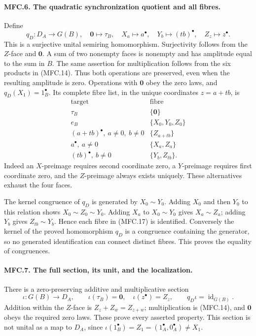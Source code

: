 \paragraph{MFC.6. The quadratic synchronization quotient and all fibres.}
Define
\[
 q_D:D_A\longrightarrow G(B),\quad
 \mathbf0\longmapsto\tau_B,\quad X_a\longmapsto a^\bullet,\quad
 Y_b\longmapsto(tb)^\bullet,\quad Z_z\longmapsto z^\bullet.
                                                               \tag{MFC.16}
\]
This is a surjective unital semiring homomorphism. Surjectivity follows
from the \(Z\)-face and \(\mathbf0\). A sum of two nonempty faces is
nonempty and has amplitude equal to the sum in \(B\). The same assertion
for multiplication follows from the six products in (MFC.14).
Thus both operations are preserved, even when the resulting amplitude
is zero. Operations with \(\mathbf0\) obey the zero laws, and
\(q_D(X_1)=1_B^\bullet\).
Its complete fibre list, in the unique coordinates \(z=a+tb\), is
\[
 \begin{array}{c|c}
 \text{target}&\text{fibre}\\ \hline
 \tau_B&\{\mathbf0\}\\
 e_B&\{X_0,Y_0,Z_0\}\\
 (a+tb)^\bullet,\ a\ne0,\ b\ne0&\{Z_{a+tb}\}\\
 a^\bullet,\ a\ne0&\{X_a,Z_a\}\\
 (tb)^\bullet,\ b\ne0&\{Y_b,Z_{tb}\}.
 \end{array}                                             \tag{MFC.17}
\]
Indeed an \(X\)-preimage requires second coordinate zero, a
\(Y\)-preimage requires first coordinate zero, and the \(Z\)-preimage
always exists uniquely. These alternatives exhaust the four faces.

The kernel congruence of \(q_D\) is generated by \(X_0\sim Y_0\).
Adding \(X_0\) and then \(Y_0\) to this relation shows
\(X_0\sim Z_0\sim Y_0\). Adding \(X_a\) to \(X_0\sim Y_0\)
gives \(X_a\sim Z_a\); adding \(Y_b\) gives
\(Z_{tb}\sim Y_b\). Hence each fibre in (MFC.17) is identified.
Conversely the kernel of the proved homomorphism \(q_D\) is a
congruence containing the generator, so no generated identification
can connect distinct fibres. This proves the equality of congruences.

\paragraph{MFC.7. The full section, its unit, and the localization.}
There is a zero-preserving additive and multiplicative section
\[
 \iota:G(B)\longrightarrow D_A,\qquad
 \iota(\tau_B)=\mathbf0,\quad \iota(z^\bullet)=Z_z,\qquad
 q_D\iota=\operatorname{id}_{G(B)}.                        \tag{MFC.18}
\]
Addition within the \(Z\)-face is \(Z_z+Z_w=Z_{z+w}\);
multiplication is (MFC.14), and \(\mathbf0\) obeys the required
zero laws. These prove every asserted property. This section is
not unital as a map to \(D_A\), since
\(\iota(1_B^\bullet)=Z_1=(1_A^\bullet,0_A^\bullet)\ne X_1\).

